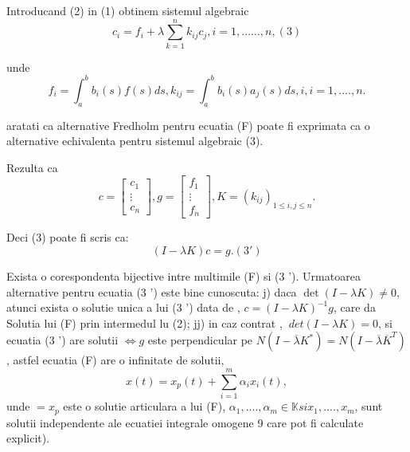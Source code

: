 \documentclass[a4paper,12pt,oneside]{report}
\begin{document}
\begin{enumerate}
		      	Introducand (2) in (1) obtinem sistemul algebraic 
		      	\begin{displaymath}
		      		c_{i} = f_{i} + \lambda \sum_{k = 1}^{n}k_{ij}c_{j}, i = 1,......,n , (3) 
		      	\end{displaymath}
		      			      			      	
		      	unde
		      	\begin{displaymath}
		      		f_{i} = \int_{a}^{b} b_{i}\left ( s \right )f\left ( s \right )ds , k_{ij} = \int_{a}^{b}b_{i}\left ( s \right )a_{j}\left ( s \right )ds, i,i = 1,....,n.
		      	\end{displaymath}
		      			      			      	
		      	aratati ca alternative Fredholm pentru ecuatia (F) poate fi exprimata ca o alternative echivalenta pentru sistemul algebraic (3). 
		      			      			      	
		      	Rezulta ca 
		      	\begin{displaymath}
		      		c = \begin{bmatrix}
		      		c_{1}\\ 
		      		\vdots \\ 
		      		c_{n}
		      		\end{bmatrix}, 
		      		g = \begin{bmatrix}
		      		f_{1}\\ 
		      		\vdots \\ 
		      		f_{n}
		      		\end{bmatrix},
		      		K = \left ( k_{ij} \right )_{1\leq i,j\leq n}.
		      	\end{displaymath}
		      			      			      	 
		      	Deci (3) poate fi scris ca:
		      	\begin{displaymath}
		      		\left ( I - \lambda K \right )c = g. (3 ')
		      	\end{displaymath}
		      			      			      	
		      	Exista o corespondenta bijective intre multimile (F) si (3 ').
		      	Urmatoarea alternative pentru ecuatia (3 ') este bine cunoscuta:
		      	j) daca \(\det \left ( I - \lambda K  \right ) \neq 0\), atunci exista o solutie unica a lui (3 ') data de , \(c = \left ( I - \lambda K \right )^{-1}g\),
		      	care da Solutia lui (F) prin intermedul lu (2);
		      	jj) in caz contrat , \(\ det \left ( I - \lambda K  \right ) = 0\), si ecuatia (3 ') are solutii \(\Leftrightarrow g\) este perpendicular pe \(N\left ( I - \overline{\lambda} K^{\ast } \right ) = N\left ( I - \overline{\lambda} \overline{K}^{T} \right )\), astfel ecuatia (F) are o infinitate de solutii, 
		      	\begin{displaymath}
		      		x \left ( t \right ) = x_{p}\left ( t \right ) + \sum_{i = 1}^{m}\alpha _{i}x_{i}\left ( t \right ), 
		      	\end{displaymath}
		      	unde \(= x_{p}\) este o solutie articulara a lui (F), \(\alpha _{1},....,\alpha _{m} \in \mathbb{K} si x _{1},....,x _{m}\), sunt solutii independente ale ecuatiei integrale omogene 9 care pot fi calculate explicit). 
		      			      			      			      			      	    

\end{enumerate}
\end{document}
